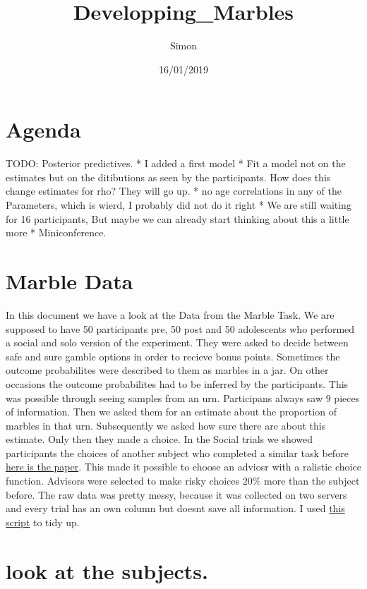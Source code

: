 \documentclass[]{article}
\title{Developping\_Marbles}
\author{Simon}
\date{16/01/2019}
\begin{document}
\maketitle

\section{Agenda}\label{agenda}

TODO: Posterior predictives. * I added a first model * Fit a model not
on the estimates but on the ditibutions as seen by the participants. How
does this change estimates for rho? They will go up. * no age
correlations in any of the Parameters, which is wierd, I probably did
not do it right * We are still waiting for 16 participants, But maybe we
can already start thinking about this a little more * Miniconference.

\section{Marble Data}\label{marble-data}

In this document we have a look at the Data from the Marble Task. We are
supposed to have 50 participants pre, 50 post and 50 adolescents who
performed a social and solo version of the experiment. They were asked
to decide between safe and sure gamble options in order to recieve bonus
points. Sometimes the outcome probabilites were described to them as
marbles in a jar. On other occasions the outcome probabilites had to be
inferred by the participants. This was possible through seeing samples
from an urn. Participans always saw 9 pieces of information. Then we
asked them for an estimate about the proportion of marbles in that urn.
Subsequently we asked how sure there are about this estimate. Only then
they made a choice. In the Social trials we showed participants the
choices of another subject who completed a similar task before
\href{http://www.tandfonline.com/doi/full/10.1080/87565641.2016.1158265}{here
is the paper}. This made it possible to choose an adviosr with a
ralistic choice function. Advisors were selected to make risky choices
20\% more than the subject before. The raw data was pretty messy,
because it was collected on two servers and every trial has an own
column but doesnt save all information. I used
\href{RawData/TidyMarble_JointTask.R}{this script} to tidy up.

\section{look at the subjects.}\label{look-at-the-subjects.}
\end{document}
